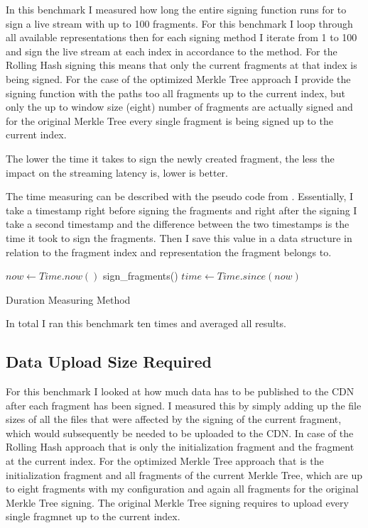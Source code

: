 In this benchmark I measured how long the entire signing function runs for to sign a live stream with up to 100 fragments. For this benchmark I loop through all available representations then for each signing method I iterate from 1 to 100 and sign the live stream at each index in accordance to the method. For the Rolling Hash signing this means that only the current fragments at that index is being signed. For the case of the optimized Merkle Tree approach I provide the signing function with the paths too all fragments up to the current index, but only the up to window size (eight) number of fragments are actually signed and for the original Merkle Tree every single fragment is being signed up to the current index.

The lower the time it takes to sign the newly created fragment, the less the impact on the streaming latency is, lower is better.

The time measuring can be described with the pseudo code from . Essentially, I take a timestamp right before signing the fragments and right after the signing I take a second timestamp and the difference between the two timestamps is the time it took to sign the fragments. Then I save this value in a data structure in relation to the fragment index and representation the fragment belongs to.

\begin{algorithm}[H]
    \begin{algorithmic}[1]
        \State $now \gets Time.now()$
        \State sign\_fragments()
        \State $time \gets Time.since(now)$        
    \end{algorithmic}
    \caption{Duration Measuring Method}
    \label{alg:time-measure}
\end{algorithm}

In total I ran this benchmark ten times and averaged all results.

\subsection{Data Upload Size Required}

For this benchmark I looked at how much data has to be published to the CDN after each fragment has been signed. I measured this by simply adding up the file sizes of all the files that were affected by the signing of the current fragment, which would subsequently be needed to be uploaded to the CDN. In case of the Rolling Hash approach that is only the initialization fragment and the fragment at the current index. For the optimized Merkle Tree approach that is the initialization fragment and all fragments of the current Merkle Tree, which are up to eight fragments with my configuration and again all fragments for the original Merkle Tree signing. The original Merkle Tree signing requires to upload every single fragmnet up to the current index.

